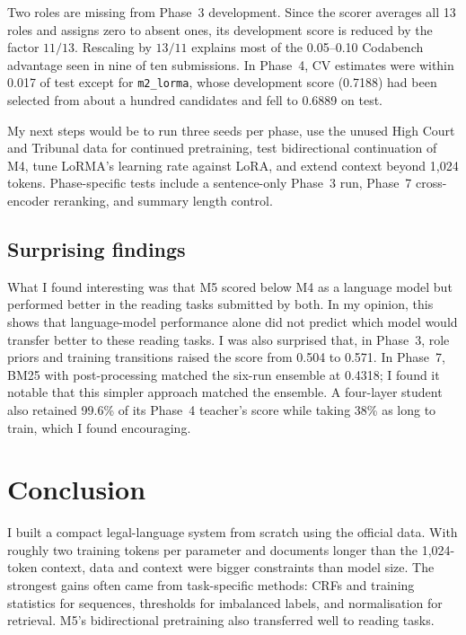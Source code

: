 \documentclass[11pt, oneside]{article}
\newcommand{\run}[1]{\texttt{#1}}
\begin{document}
Two roles are missing from Phase~3 development. Since the scorer averages all 13 roles and assigns zero to absent
ones, its development score is reduced by the factor $11/13$. Rescaling by $13/11$ explains most of the 0.05--0.10
Codabench advantage seen in nine of ten submissions. In Phase~4, CV estimates were within 0.017 of test except for
\run{m2\_lorma}, whose development score (0.7188) had been selected from about a hundred candidates and fell to
0.6889 on test.

My next steps would be to run three seeds per phase, use the unused High Court and Tribunal data for continued pretraining,
test bidirectional continuation of M4, tune LoRMA's learning rate against LoRA, and extend context beyond 1{,}024
tokens. Phase-specific tests include a sentence-only Phase~3 run, Phase~7 cross-encoder reranking, and summary length
control.

\subsection{Surprising findings}
What I found interesting was that M5 scored below M4 as a language model but performed better in the reading tasks
submitted by both. In my opinion, this shows that language-model performance alone did not predict which model
would transfer better to these reading tasks. I was also surprised that, in Phase~3, role priors and training
transitions raised the score from 0.504 to 0.571. In Phase~7, BM25 with post-processing matched the six-run
ensemble at 0.4318; I found it notable that this simpler approach matched the ensemble. A four-layer student also
retained 99.6\% of its Phase~4 teacher's score while taking 38\% as long to train, which I found encouraging.

\section{Conclusion}
I built a compact legal-language system from scratch using the official data. With roughly two training tokens per
parameter and documents longer than the 1{,}024-token context, data and context were bigger constraints than model
size. The strongest gains often came from task-specific methods: CRFs and training statistics for sequences,
thresholds for imbalanced labels, and normalisation for retrieval. M5's bidirectional pretraining also transferred
well to reading tasks.
\end{document}
